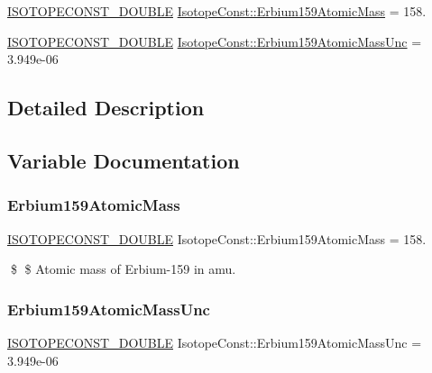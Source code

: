 \begin{DoxyCompactItemize}
\item 
\mbox{\hyperlink{group___isotope_const-_macros_ga8f45a7272ce02c0b4c65c44636ed719a}{I\+S\+O\+T\+O\+P\+E\+C\+O\+N\+S\+T\+\_\+\+D\+O\+U\+B\+LE}} \mbox{\hyperlink{group___isotope_const-_erbium-_er159_gac7f101f871b9eb987efdf614da0b8736}{Isotope\+Const\+::\+Erbium159\+Atomic\+Mass}} = 158.
\item 
\mbox{\hyperlink{group___isotope_const-_macros_ga8f45a7272ce02c0b4c65c44636ed719a}{I\+S\+O\+T\+O\+P\+E\+C\+O\+N\+S\+T\+\_\+\+D\+O\+U\+B\+LE}} \mbox{\hyperlink{group___isotope_const-_erbium-_er159_ga640b4fd167952c20a9545fdb10ba94e4}{Isotope\+Const\+::\+Erbium159\+Atomic\+Mass\+Unc}} = 3.\+949e-\/06
\end{DoxyCompactItemize}


\subsection{Detailed Description}


\subsection{Variable Documentation}
\mbox{\label{group___isotope_const-_erbium-_er159_gac7f101f871b9eb987efdf614da0b8736}} 
\subsubsection{\texorpdfstring{Erbium159\+Atomic\+Mass}{Erbium159AtomicMass}}
{\footnotesize\ttfamily \mbox{\hyperlink{group___isotope_const-_macros_ga8f45a7272ce02c0b4c65c44636ed719a}{I\+S\+O\+T\+O\+P\+E\+C\+O\+N\+S\+T\+\_\+\+D\+O\+U\+B\+LE}} Isotope\+Const\+::\+Erbium159\+Atomic\+Mass = 158.}

\$ \$ Atomic mass of Erbium-\/159 in amu. \mbox{\label{group___isotope_const-_erbium-_er159_ga640b4fd167952c20a9545fdb10ba94e4}} 
\subsubsection{\texorpdfstring{Erbium159\+Atomic\+Mass\+Unc}{Erbium159AtomicMassUnc}}
{\footnotesize\ttfamily \mbox{\hyperlink{group___isotope_const-_macros_ga8f45a7272ce02c0b4c65c44636ed719a}{I\+S\+O\+T\+O\+P\+E\+C\+O\+N\+S\+T\+\_\+\+D\+O\+U\+B\+LE}} Isotope\+Const\+::\+Erbium159\+Atomic\+Mass\+Unc = 3.\+949e-\/06}

